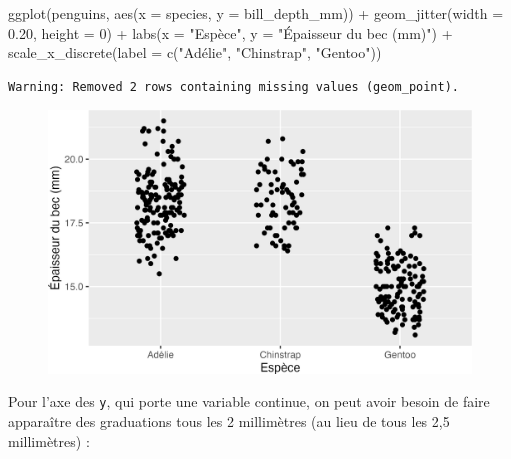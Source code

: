 \documentclass[
  letterpaper,
  DIV=11,
  numbers=noendperiod]{scrreprt}
\newenvironment{Shaded}{\begin{snugshade}}{\end{snugshade}}
\newcommand{\AttributeTok}[1]{\textcolor[rgb]{0.40,0.45,0.13}{#1}}
\newcommand{\DecValTok}[1]{\textcolor[rgb]{0.68,0.00,0.00}{#1}}
\newcommand{\FloatTok}[1]{\textcolor[rgb]{0.68,0.00,0.00}{#1}}
\newcommand{\FunctionTok}[1]{\textcolor[rgb]{0.28,0.35,0.67}{#1}}
\newcommand{\NormalTok}[1]{\textcolor[rgb]{0.00,0.23,0.31}{#1}}
\newcommand{\SpecialCharTok}[1]{\textcolor[rgb]{0.37,0.37,0.37}{#1}}
\newcommand{\StringTok}[1]{\textcolor[rgb]{0.13,0.47,0.30}{#1}}
\begin{document}
\begin{Shaded}
\begin{Highlighting}[]
\FunctionTok{ggplot}\NormalTok{(penguins, }\FunctionTok{aes}\NormalTok{(}\AttributeTok{x =}\NormalTok{ species, }\AttributeTok{y =}\NormalTok{ bill\_depth\_mm)) }\SpecialCharTok{+}
  \FunctionTok{geom\_jitter}\NormalTok{(}\AttributeTok{width =} \FloatTok{0.20}\NormalTok{, }\AttributeTok{height =} \DecValTok{0}\NormalTok{) }\SpecialCharTok{+}
  \FunctionTok{labs}\NormalTok{(}\AttributeTok{x =} \StringTok{"Espèce"}\NormalTok{, }\AttributeTok{y =} \StringTok{"Épaisseur du bec (mm)"}\NormalTok{) }\SpecialCharTok{+}
  \FunctionTok{scale\_x\_discrete}\NormalTok{(}\AttributeTok{label =} \FunctionTok{c}\NormalTok{(}\StringTok{"Adélie"}\NormalTok{, }\StringTok{"Chinstrap"}\NormalTok{, }\StringTok{"Gentoo"}\NormalTok{))}
\end{Highlighting}
\end{Shaded}

\begin{verbatim}
Warning: Removed 2 rows containing missing values (geom_point).
\end{verbatim}

\begin{figure}[H]

{\centering \includegraphics{./03-visualization_files/figure-pdf/unnamed-chunk-105-1.png}

}

\end{figure}

Pour l'axe des \texttt{y}, qui porte une variable continue, on peut
avoir besoin de faire apparaître des graduations tous les 2 millimètres
(au lieu de tous les 2,5 millimètres) :
\end{document}
